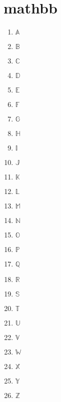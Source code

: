 \documentclass{scrartcl}
\begin{document}
\section{mathbb}
\begin{multicols}{3}
\begin{enumerate}[label=\Alph*:]
    \item $\mathbb{A}$
    \item $\mathbb{B}$
    \item $\mathbb{C}$
    \item $\mathbb{D}$
    \item $\mathbb{E}$
    \item $\mathbb{F}$
    \item $\mathbb{G}$
    \item $\mathbb{H}$
    \item $\mathbb{I}$
    \item $\mathbb{J}$
    \item $\mathbb{K}$
    \item $\mathbb{L}$
    \item $\mathbb{M}$
    \item $\mathbb{N}$
    \item $\mathbb{O}$
    \item $\mathbb{P}$
    \item $\mathbb{Q}$
    \item $\mathbb{R}$
    \item $\mathbb{S}$
    \item $\mathbb{T}$
    \item $\mathbb{U}$
    \item $\mathbb{V}$
    \item $\mathbb{W}$
    \item $\mathbb{X}$
    \item $\mathbb{Y}$
    \item $\mathbb{Z}$
\end{enumerate}
\end{multicols}
\clearpage
\end{document}
